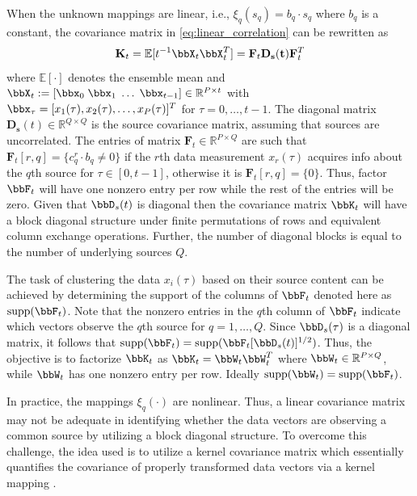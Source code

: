\documentclass[10pt,final]{IEEEtran}
\begin{document}
When the unknown mappings are linear, i.e., $\xi_q(s_q)=b_q\cdot s_q$ where $b_q$ is a constant, the covariance matrix in \eqref{eq:linear_correlation} can be rewritten as 
\begin{equation}\label{eq:linear_corr_fact}
\mathbf{K}_t= \mathbb{E}[t^{-1}\bbX_t\bbX_t^T]=\mathbf{F}_t\mathbf{D_s(t)}\mathbf{F}_t^T
\end{equation}
where $\mathbb{E}[\cdot]$ denotes the ensemble mean and $\bbX_t:=[\bbx_0\;\bbx_1\;\ldots\;\bbx_{t-1}]\in\mathbb{R}^{P\times t}$ with $\bbx_{\tau}=[x_1(\tau),x_2(\tau),\ldots,x_P(\tau)]^T$ for $\tau=0,\ldots,t-1$. The diagonal matrix ${\mathbf{D_s}(t) \in \mathbb{R}^{Q\times Q}}$ is the source covariance matrix, assuming that sources are uncorrelated. The entries of matrix $\mathbf{F}_{t} \in \mathbb{R}^{P\times Q} $ are such that $\mathbf{F}_{t}[r,q] = \{c_{q}^{r}\cdot b_q \ne 0\}$  if the $r$th data measurement $x_r(\tau)$ acquires info about the $q$th source for $\tau\in[0,t-1]$, otherwise it is $\mathbf{F}_{t}[r,q]  = \{0\}$. Thus, factor $\bbF_{t}$ will have one nonzero entry per row while the rest of the entries will be zero. Given that $\bbD_{s}(t)$ is diagonal then the covariance matrix $\bbK_t$ will have a block diagonal structure under finite permutations of rows and equivalent column exchange operations. Further, the number of diagonal blocks is equal to the number of underlying sources $Q$.

The task of clustering the data $x_i(\tau)$ based on their source content can be achieved by determining the support of the columns of $\bbF_{t}$ denoted here  as $\textrm{supp}(\bbF_{t})$. Note that the nonzero entries in the $q$th column of $\bbF_t$ indicate which vectors observe the $q$th source for $q=1,\ldots,Q$. Since $\bbD_s(\tau)$ is a diagonal matrix, it follows that $\textrm{supp}(\bbF_t) = \textrm{supp}(\bbF_t [\bbD_s(t)]^{1/2})$. Thus, the objective is to factorize $\bbK_t$  as $\bbK_{t}=\bbW_t\bbW_t^T$  where $\bbW_t\in\mathbb{R}^{P\times Q}$, while $\bbW_t$ has one nonzero entry per row. Ideally $\textrm{supp}(\bbW_t) =
\textrm{supp}(\bbF_t)$.

In practice, the mappings $\xi_q(\cdot)$ are nonlinear. Thus, a linear covariance matrix may not be adequate in  identifying whether the data vectors are observing a common source by utilizing a block diagonal structure. To overcome this challenge, the idea used is to utilize a kernel covariance matrix
which essentially quantifies the covariance of properly transformed data vectors via a kernel mapping \cite{Online Multiple Kernel Learning,DCA}.
\end{document}
